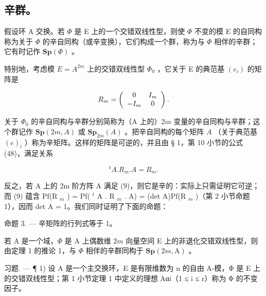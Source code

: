 \subsection{辛群。}

假设环 A 交换。若 \(\Phi\) 是 E 上的一个交错双线性型，则使 \(\Phi\) 不变的模 E 的自同构称为关于 \(\Phi\) 的辛自同构（或辛变换），它们构成一个群，称为与 \(\Phi\) 相伴的辛群；它有时记作 \(\mathbf{Sp}(\Phi)\) 。

特别地，考虑模 \(E = A^{2m}\) 上的交错双线性型 \(\Phi_{0}\) ，它关于 E 的典范基 \((e_{i})\) 的矩阵是

\[
R _ {m} = \left( \begin{array}{c c} 0 & I _ {m} \\ - I _ {m} & 0 \end{array} \right).
\]

关于 \(\Phi_{0}\) 的辛自同构与辛群分别简称为（A 上的）\(2m\) 变量的辛自同构与辛群；这个群记作 \(\mathbf{Sp}(2m, A)\) 或 \(\mathbf{Sp}_{2m}(A)\) 。把辛自同构的每个矩阵 \(A\) （关于典范基 \((e)_i\) ）称为辛矩阵。这样的矩阵是可逆的，并且由 § 1，第 10 小节的公式 (48)，满足关系

\[
{ } ^ { t } A . R _ { m } . A = R _ { m } .\tag{9}
\]

反之，若 A 上的 2m 阶方阵 A 满足 (9)，则它是辛的：实际上只需证明它可逆；而 (9) 蕴含 Pf(R \(_{m}\) ) = Pf( \(^{t}\) A . R \(_{m}\) . A) = (det A)Pf(R \(_{m}\) )（第 2 小节命题 1），因而 det A = 1。我们同时证明了下面的命题：

命题 3. --- 辛矩阵的行列式等于 1。

若 A 是一个域，\(\Phi\) 是 A 上偶数维 \(2m\) 向量空间 E 上的非退化交错双线性型，则由定理 1 的推论 1，与 \(\Phi\) 相伴的辛群同构于 \(\mathbf{Sp}(2m, \mathrm{A})\) 。

习题. --- ¶ 1) 设 A 是一个主交换环，E 是有限维数为 n 的自由 A-模，Φ 是 E 上的交错双线性型；第 1 小节定理 1 中定义的理想 Aαi（1 ≤ i ≤ r）称为 Φ 的不变因子。

